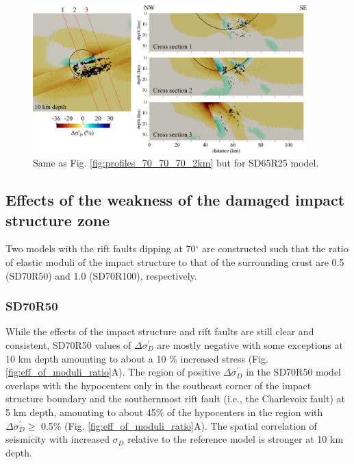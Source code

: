 \documentclass[draft]{agujournal2018}
\begin{document}
\begin{figure}[ht]
\centering
\includegraphics[width=25pc]{Figures/SD65R25_profiles.png}
\caption{Same as Fig. \ref{fig:profiles_70_70_70_2km} but for SD65R25 model.}
\label{fig:profiles_65_40_40_2km}
\end{figure}

\subsection{Effects of the weakness of the damaged impact structure zone}
Two models with the rift faults dipping at 70$^{\circ}$ are constructed such that the ratio of elastic moduli of the impact structure to that of the surrounding crust are 0.5 (SD70R50) and 1.0 (SD70R100), respectively.

\subsubsection{SD70R50}
While the effects of the impact structure and rift faults are still clear and consistent, SD70R50 values of $\Delta \sigma_{D}^{\prime}$ are mostly negative with some exceptions at 10 km depth amounting to about a 10 \% increased stress (Fig. \ref{fig:eff_of_moduli_ratio}A). The region of positive $\Delta\sigma_{D}^{\prime}$ in the SD70R50 model overlaps with the hypocenters only in the southeast corner of the impact structure boundary and the southernmost rift fault (i.e., the Charlevoix fault) at 5 km depth, amounting to about 45\% of the hypocenters in the region with $\Delta\sigma_{D}^{\prime} \ge$ 0.5\% (Fig. \ref{fig:eff_of_moduli_ratio}A). The spatial correlation of seismicity with increased $\sigma_{D}$ relative to the reference model is stronger at 10 km depth.
\end{document}
